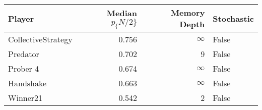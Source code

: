 \begin{tabular}{lrrl}
\toprule
             Player &  Median $p_\{N/2\}$ &  Memory Depth & Stochastic \\
\midrule
 CollectiveStrategy &             0.756 &            \(\infty\) &      False \\
           Predator &             0.702 &             9 &      False \\
           Prober 4 &             0.674 &            \(\infty\) &      False \\
          Handshake &             0.663 &            \(\infty\) &      False \\
           Winner21 &             0.542 &             2 &      False \\
\bottomrule
\end{tabular}
